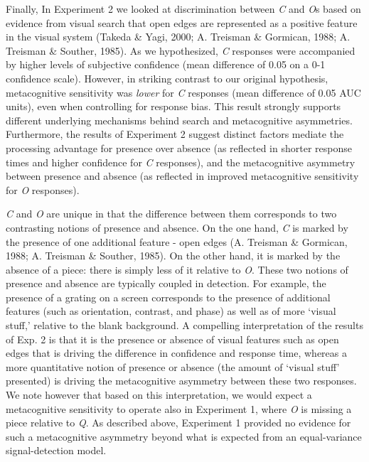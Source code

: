 \documentclass[12pt,twoside]{reedthesis}
\begin{document}
Finally, In Experiment 2 we looked at discrimination between \emph{C} and \emph{O}s based on evidence from visual search that open edges are represented as a positive feature in the visual system (Takeda \& Yagi, 2000; A. Treisman \& Gormican, 1988; A. Treisman \& Souther, 1985). As we hypothesized, \emph{C} responses were accompanied by higher levels of subjective confidence (mean difference of 0.05 on a 0-1 confidence scale). However, in striking contrast to our original hypothesis, metacognitive sensitivity was \emph{lower} for \emph{C} responses (mean difference of 0.05 AUC units), even when controlling for response bias. This result strongly supports different underlying mechanisms behind search and metacognitive asymmetries. Furthermore, the results of Experiment 2 suggest distinct factors mediate the processing advantage for presence over absence (as reflected in shorter response times and higher confidence for \emph{C} responses), and the metacognitive asymmetry between presence and absence (as reflected in improved metacognitive sensitivity for \emph{O} responses).

\emph{C} and \emph{O} are unique in that the difference between them corresponds to two contrasting notions of presence and absence. On the one hand, \emph{C} is marked by the presence of one additional feature - open edges (A. Treisman \& Gormican, 1988; A. Treisman \& Souther, 1985). On the other hand, it is marked by the absence of a piece: there is simply less of it relative to \emph{O}. These two notions of presence and absence are typically coupled in detection. For example, the presence of a grating on a screen corresponds to the presence of additional features (such as orientation, contrast, and phase) as well as of more `visual stuff,' relative to the blank background. A compelling interpretation of the results of Exp. 2 is that it is the presence or absence of visual features such as open edges that is driving the difference in confidence and response time, whereas a more quantitative notion of presence or absence (the amount of `visual stuff' presented) is driving the metacognitive asymmetry between these two responses. We note however that based on this interpretation, we would expect a metacognitive sensitivity to operate also in Experiment 1, where \emph{O} is missing a piece relative to \emph{Q}. As described above, Experiment 1 provided no evidence for such a metacognitive asymmetry beyond what is expected from an equal-variance signal-detection model.
\end{document}
